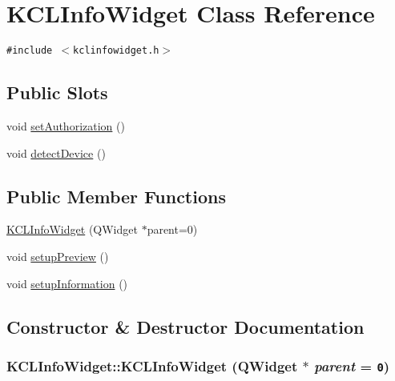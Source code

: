 \hypertarget{class_k_c_l_info_widget}{
\section{KCLInfoWidget Class Reference}
\label{class_k_c_l_info_widget}
}
{\tt \#include $<$kclinfowidget.h$>$}

\subsection*{Public Slots}
\begin{CompactItemize}
\item 
void \hyperlink{class_k_c_l_info_widget_b7f7f09972a7e342f29f222bdff11705}{setAuthorization} ()
\item 
void \hyperlink{class_k_c_l_info_widget_df73eaa8bd4c3f8f7c5748c201f03a84}{detectDevice} ()
\end{CompactItemize}
\subsection*{Public Member Functions}
\begin{CompactItemize}
\item 
\hyperlink{class_k_c_l_info_widget_2114f10ac40847ddafb03d19bebef203}{KCLInfoWidget} (QWidget $\ast$parent=0)
\item 
void \hyperlink{class_k_c_l_info_widget_64ab942e6b535ad68695be814466745a}{setupPreview} ()
\item 
void \hyperlink{class_k_c_l_info_widget_313172b736bb1598e01443aa538fce20}{setupInformation} ()
\end{CompactItemize}


\subsection{Constructor \& Destructor Documentation}
\hypertarget{class_k_c_l_info_widget_2114f10ac40847ddafb03d19bebef203}{
\subsubsection[{KCLInfoWidget}]{\setlength{\rightskip}{0pt plus 5cm}KCLInfoWidget::KCLInfoWidget (QWidget $\ast$ {\em parent} = {\tt 0})}}
\label{class_k_c_l_info_widget_2114f10ac40847ddafb03d19bebef203}





